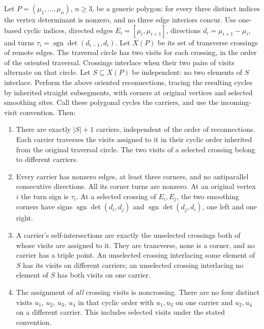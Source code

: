 \begin{lemma}\label{lem:carriers}
Let $P=(\mu_1,\ldots,\mu_n)$, $n\geq3$, be a generic polygon: for every
three distinct indices the vertex determinant is nonzero, and no three
edge interiors concur.
Use one-based cyclic indices, directed edges
$E_i=[\mu_i,\mu_{i+1}]$, directions $d_i=\mu_{i+1}-\mu_i$, and turns
$\tau_i=\operatorname{sgn}\det(d_{i-1},d_i)$.
Let $X(P)$ be its set of transverse crossings of remote edges. The
traversal circle has two visits for each crossing, in the order of the
oriented traversal. Crossings interlace when their two pairs of visits
alternate on that circle. Let $S\subseteq X(P)$ be independent: no two
elements of $S$ interlace. Perform the above oriented reconnections,
tracing the resulting cycles by inherited straight subsegments, with
corners at original vertices and selected smoothing sites. Call these
polygonal cycles the carriers, and use the incoming-visit convention.
Then:
\begin{enumerate}
\item[(i)] There are exactly $|S|+1$ carriers, independent of the order
of reconnections. Each carrier traverses the visits assigned to it in
their cyclic order inherited from the original traversal circle.
The two visits of a selected crossing belong to different carriers.
\item[(ii)] Every carrier has nonzero edges, at least three corners,
and no antiparallel consecutive directions. All its corner turns are
nonzero. At an original vertex $i$ the turn sign is $\tau_i$.
At a selected crossing of $E_i,E_j$, the two smoothing corners have
signs $\operatorname{sgn}\det(d_i,d_j)$ and
$\operatorname{sgn}\det(d_j,d_i)$, one left and one right.
\item[(iii)] A carrier's self-intersections are exactly the unselected
crossings both of whose visits are assigned to it. They are transverse,
none is a corner, and no carrier has a triple point. An unselected
crossing interlacing some element of $S$ has its visits on different
carriers; an unselected crossing interlacing no element of $S$ has
both visits on one carrier.
\item[(iv)] The assignment of \emph{all} crossing visits is noncrossing.
There are no four distinct visits $u_1$, $u_2$, $u_3$, $u_4$ in that cyclic order
with $u_1,u_3$ on one carrier and $u_2,u_4$ on a different carrier.
This includes selected visits under the stated convention.
\end{enumerate}
\end{lemma}

